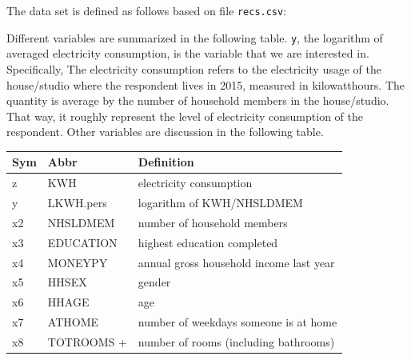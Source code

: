 \documentclass[a4paper]{article}
\newenvironment{Shaded}{\begin{snugshade}}{\end{snugshade}}
\newcommand{\CommentTok}[1]{\textcolor[rgb]{0.56,0.35,0.01}{\textit{#1}}}
\newcommand{\DataTypeTok}[1]{\textcolor[rgb]{0.13,0.29,0.53}{#1}}
\newcommand{\DecValTok}[1]{\textcolor[rgb]{0.00,0.00,0.81}{#1}}
\newcommand{\KeywordTok}[1]{\textcolor[rgb]{0.13,0.29,0.53}{\textbf{#1}}}
\newcommand{\NormalTok}[1]{#1}
\newcommand{\OperatorTok}[1]{\textcolor[rgb]{0.81,0.36,0.00}{\textbf{#1}}}
\newcommand{\StringTok}[1]{\textcolor[rgb]{0.31,0.60,0.02}{#1}}
\begin{document}
The data set is defined as follows based on file \texttt{recs.csv}:

\begin{Shaded}
\end{Shaded}

Different variables are summarized in the following table. \texttt{y},
the logarithm of averaged electricity consumption, is the variable that
we are interested in. Specifically, The electricity consumption refers
to the electricity usage of the house/studio where the respondent lives
in 2015, measured in kilowatthours. The quantity is average by the
number of household members in the house/studio. That way, it roughly
represent the level of electricity consumption of the respondent. Other
variables are discussion in the following table.

\begin{longtable}[]{@{}lll@{}}
\toprule
Sym & Abbr & Definition\tabularnewline
\midrule
\endhead
z & KWH & electricity consumption\tabularnewline
y & LKWH.pers & logarithm of KWH/NHSLDMEM\tabularnewline
x2 & NHSLDMEM & number of household members\tabularnewline
x3 & EDUCATION & highest education completed\tabularnewline
x4 & MONEYPY & annual gross household income last year\tabularnewline
x5 & HHSEX & gender\tabularnewline
x6 & HHAGE & age\tabularnewline
x7 & ATHOME & number of weekdays someone is at home\tabularnewline
x8 & TOTROOMS + & number of rooms (including bathrooms)\tabularnewline
\bottomrule
\end{longtable}
\end{document}
